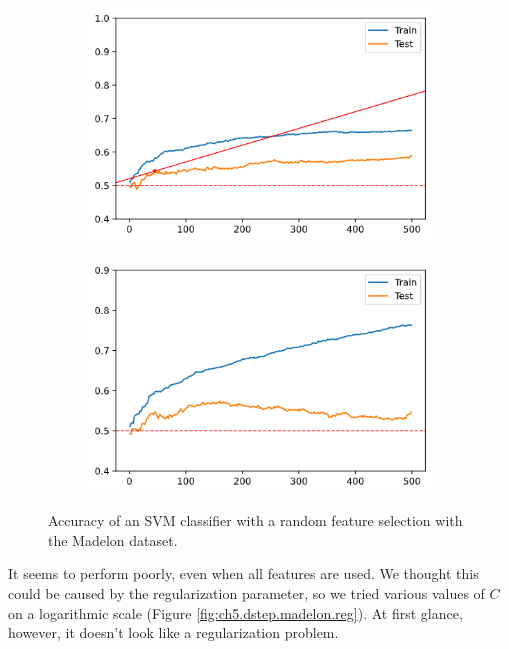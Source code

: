 \begin{figure}[H]
    \centering
    \begin{subfigure}[b]{0.4\linewidth}
        \includegraphics[width=\linewidth]{img/ch5/dstep/madelon-random.png}
    \end{subfigure}
    \begin{subfigure}[b]{0.4\linewidth}
        \includegraphics[width=\linewidth]{img/ch5/madelon-random-c_1}
    \end{subfigure}
    \caption{Accuracy of an SVM classifier with a random feature selection with the Madelon dataset.}
    \label{fig:ch5.dstep.madelon.rand}
\end{figure}

It seems to perform poorly, even when all features are used. We thought this could be caused by the regularization parameter, so we tried various values of $C$ on a logarithmic scale (Figure \ref{fig:ch5.dstep.madelon.reg}). At first glance, however, it doesn't look like a regularization problem.

